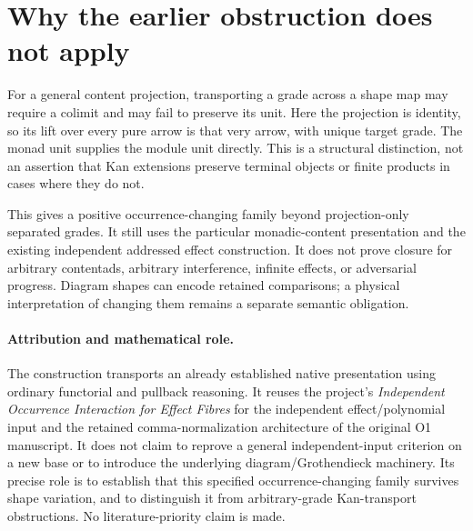 \documentclass[11pt]{article}
\begin{document}
\section{Why the earlier obstruction does not apply}
For a general content projection, transporting a grade across a shape map may require a colimit and may fail to preserve its unit. Here the projection is identity, so its lift over every pure arrow is that very arrow, with unique target grade. The monad unit supplies the module unit directly. This is a structural distinction, not an assertion that Kan extensions preserve terminal objects or finite products in cases where they do not.

This gives a positive occurrence-changing family beyond projection-only separated grades. It still uses the particular monadic-content presentation and the existing independent addressed effect construction. It does not prove closure for arbitrary contentads, arbitrary interference, infinite effects, or adversarial progress. Diagram shapes can encode retained comparisons; a physical interpretation of changing them remains a separate semantic obligation.
\paragraph{Attribution and mathematical role.} The construction transports an already established native presentation using ordinary functorial and pullback reasoning. It reuses the project's \emph{Independent Occurrence Interaction for Effect Fibres} for the independent effect/polynomial input and the retained comma-normalization architecture of the original O1 manuscript. It does not claim to reprove a general independent-input criterion on a new base or to introduce the underlying diagram/Grothendieck machinery. Its precise role is to establish that this specified occurrence-changing family survives shape variation, and to distinguish it from arbitrary-grade Kan-transport obstructions. No literature-priority claim is made.
\end{document}
